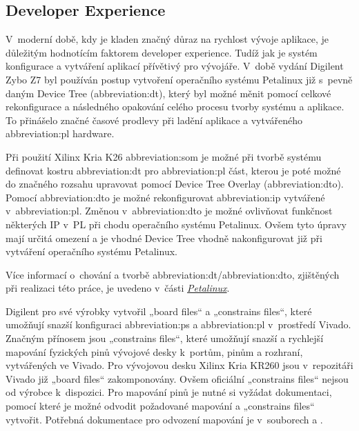 \documentclass[a4paper, twoside, 11pt]{article}
\begin{document}
			\subsection{Developer Experience}
					V~moderní době, kdy je kladen značný důraz na rychlost vývoje aplikace, je důležitým hodnotícím faktorem developer experience. Tudíž jak je systém konfigurace a vytváření aplikací přívětivý pro vývojáře. V~době vydání Digilent Zybo Z7 byl používán postup vytvoření operačního systému Petalinux již s~pevně daným Device Tree (\gls{abbreviation:dt}), který byl možné měnit pomocí celkové rekonfigurace a následného opakování celého procesu tvorby systému a aplikace. To přinášelo značné časové prodlevy při ladění aplikace a vytvářeného \gls{abbreviation:pl} hardware.\par
					Při použití Xilinx Kria K26 \gls{abbreviation:som} je možné při tvorbě systému definovat kostru \gls{abbreviation:dt} pro \gls{abbreviation:pl} část, kterou je poté možné do značného rozsahu upravovat pomocí Device Tree Overlay (\gls{abbreviation:dto}). Pomocí \gls{abbreviation:dto} je možné rekonfigurovat \gls{abbreviation:ip} vytvářené v~\gls{abbreviation:pl}. Změnou v~\gls{abbreviation:dto} je možné ovlivňovat funkčnost některých IP v~PL při chodu operačního systému Petalinux. Ovšem tyto úpravy mají určitá omezení a je vhodné Device Tree vhodně nakonfigurovat již při vytváření operačního systému Petalinux.\par
					Více informací o~chování a tvorbě \gls{abbreviation:dt}/\gls{abbreviation:dto}, zjištěných při realizaci této práce, je uvedeno v~části \hyperref[subsec:petalinux]{\textit{Petalinux}}.\par
					Digilent pro své výrobky vytvořil „board files“ a „constrains files“, které umožňují snazší konfiguraci \gls{abbreviation:ps} a \gls{abbreviation:pl} v~prostředí Vivado. Značným přínosem jsou „constrains files“, které umožňují snazší a rychlejší mapování fyzických pinů vývojové desky k~portům, pinům a rozhraní, vytvářených ve Vivado. Pro vývojovou desku Xilinx Kria KR260 jsou v~repozitáři Vivado již „board files“ zakomponovány. Ovšem oficiální „constrains files“ nejsou od výrobce k~dispozici. Pro mapování pinů je nutné si vyžádat dokumentaci, pomocí které je možné odvodit požadované mapování a „constrains files“ vytvořit. Potřebná dokumentace pro odvození mapování je v~souborech \cite{kria-kr260-starter-kit-cc-schematics} a \cite{kria-k26-som-xdc}.
\end{document}
